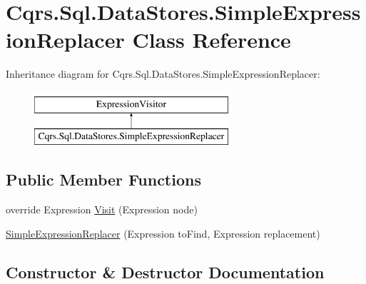 \hypertarget{classCqrs_1_1Sql_1_1DataStores_1_1SimpleExpressionReplacer}{}\section{Cqrs.\+Sql.\+Data\+Stores.\+Simple\+Expression\+Replacer Class Reference}
\label{classCqrs_1_1Sql_1_1DataStores_1_1SimpleExpressionReplacer}
Inheritance diagram for Cqrs.\+Sql.\+Data\+Stores.\+Simple\+Expression\+Replacer\+:\begin{figure}[H]
\begin{center}
\leavevmode
\includegraphics[height=2.000000cm]{classCqrs_1_1Sql_1_1DataStores_1_1SimpleExpressionReplacer}
\end{center}
\end{figure}
\subsection*{Public Member Functions}
\begin{DoxyCompactItemize}
\item 
override Expression \hyperlink{classCqrs_1_1Sql_1_1DataStores_1_1SimpleExpressionReplacer_a362c833782ea518d3b10f74898136241_a362c833782ea518d3b10f74898136241}{Visit} (Expression node)
\item 
\hyperlink{classCqrs_1_1Sql_1_1DataStores_1_1SimpleExpressionReplacer_a71555cd5aeb393426bedce91d3325cd0_a71555cd5aeb393426bedce91d3325cd0}{Simple\+Expression\+Replacer} (Expression to\+Find, Expression replacement)
\end{DoxyCompactItemize}


\subsection{Constructor \& Destructor Documentation}
\mbox{\label{classCqrs_1_1Sql_1_1DataStores_1_1SimpleExpressionReplacer_a71555cd5aeb393426bedce91d3325cd0_a71555cd5aeb393426bedce91d3325cd0}} 
